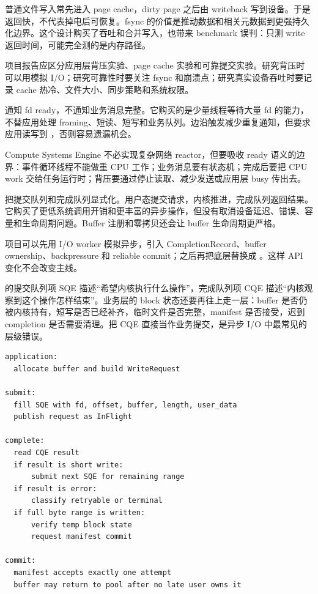 \begin{casebox}
普通文件写入常先进入 page cache，dirty page 之后由 writeback 写到设备。于是  返回快，不代表掉电后可恢复。fsync 的价值是推动数据和相关元数据到更强持久化边界。这个设计购买了吞吐和合并写入，也带来 benchmark 误判：只测 write 返回时间，可能完全测的是内存路径。

项目报告应区分应用层背压实验、page cache 实验和可靠提交实验。研究背压时可以用模拟 I/O；研究可靠性时要关注 fsync 和崩溃点；研究真实设备吞吐时要记录 cache 热冷、文件大小、同步策略和系统权限。
\end{casebox}

\begin{casebox}
 通知 fd ready，不通知业务消息完整。它购买的是少量线程等待大量 fd 的能力，不替应用处理 framing、短读、短写和业务队列。边沿触发减少重复通知，但要求应用读写到 ，否则容易遗漏机会。

Compute Systems Engine 不必实现复杂网络 reactor，但要吸收 ready 语义的边界：事件循环线程不能做重 CPU 工作；业务消息要有状态机；完成后要把 CPU work 交给任务运行时；背压要通过停止读取、减少发送或应用层 busy 传出去。
\end{casebox}

\begin{casebox}
 把提交队列和完成队列显式化。用户态提交请求，内核推进，完成队列返回结果。它购买了更低系统调用开销和更丰富的异步操作，但没有取消设备延迟、错误、容量和生命周期问题。Buffer 注册和零拷贝还会让 buffer 生命周期更严格。

项目可以先用 I/O worker 模拟异步，引入 CompletionRecord、buffer ownership、backpressure 和 reliable commit；之后再把底层替换成 。这样 API 变化不会改变主线。
\end{casebox}

 的提交队列项 SQE 描述“希望内核执行什么操作”，完成队列项 CQE 描述“内核观察到这个操作怎样结束”。业务层的 block 状态还要再往上走一层：buffer 是否仍被内核持有，短写是否已经补齐，临时文件是否完整，manifest 是否接受，迟到 completion 是否需要清理。把 CQE 直接当作业务提交，是异步 I/O 中最常见的层级错误。

\begin{lstlisting}[numbers=none,caption={从 SQE 到业务提交的状态层次}]
application:
  allocate buffer and build WriteRequest

submit:
  fill SQE with fd, offset, buffer, length, user_data
  publish request as InFlight

complete:
  read CQE result
  if result is short write:
      submit next SQE for remaining range
  if result is error:
      classify retryable or terminal
  if full byte range is written:
      verify temp block state
      request manifest commit

commit:
  manifest accepts exactly one attempt
  buffer may return to pool after no late user owns it
\end{lstlisting}

